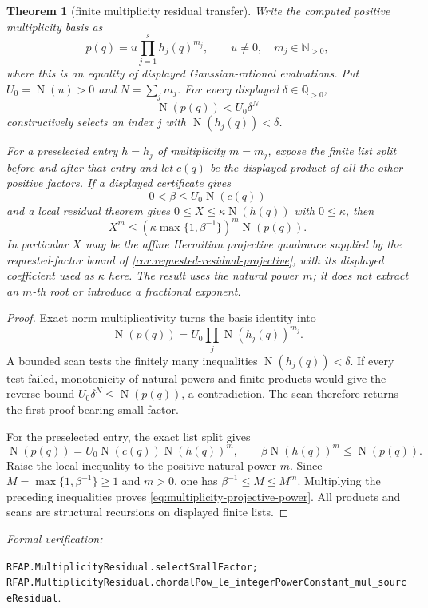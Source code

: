 \documentclass[11pt]{article}
\newtheorem{theorem}{Theorem}[section]
\newcommand{\Q}{\mathbb{Q}}
\newcommand{\N}{\mathbb{N}}
\newcommand{\Norm}[1]{\operatorname{N}\!\left(#1\right)}
\newcommand{\leanref}[1]{\par\smallskip\noindent
  \emph{Formal verification:}\par\nobreak
  {\raggedright\nolinkurl{#1}.\par}}
\begin{document}
\begin{theorem}[finite multiplicity residual transfer]
\label{thm:multiplicity-residual}
Write the computed positive multiplicity basis as
\[
             p(q)=u\prod_{j=1}^{s}h_j(q)^{m_j},
 \qquad u\ne0,\quad m_j\in\N_{>0},
\]
where this is an equality of displayed Gaussian-rational evaluations.  Put
$U_0=\Norm u>0$ and $N=\sum_jm_j$.  For every displayed
$\delta\in\Q_{>0}$,
\[
             \Norm{p(q)}<U_0\delta^N
\]
constructively selects an index $j$ with
$\Norm{h_j(q)}<\delta$.

For a preselected entry $h=h_j$ of multiplicity $m=m_j$, expose the finite
list split before and after that entry and let $c(q)$ be the displayed product
of all the other positive factors.  If a displayed certificate gives
\[
       0<\beta\le U_0\Norm{c(q)}
\]
and a local residual theorem gives
$0\le X\le\kappa\Norm{h(q)}$ with $0\le\kappa$, then
\begin{equation}
\label{eq:multiplicity-projective-power}
 X^m\le
 \left(\kappa\max\{1,\beta^{-1}\}\right)^m\Norm{p(q)}.
\end{equation}
In particular $X$ may be the affine Hermitian projective quadrance supplied
by the requested-factor bound of
\cref{cor:requested-residual-projective}, with its
displayed coefficient used as $\kappa$ here.  The result uses the natural power $m$;
it does not extract an $m$-th root or introduce a fractional exponent.
\end{theorem}

\begin{proof}
Exact norm multiplicativity turns the basis identity into
\[
 \Norm{p(q)}=U_0\prod_j\Norm{h_j(q)}^{m_j}.
\]
A bounded scan tests the finitely many inequalities
$\Norm{h_j(q)}<\delta$.  If every test failed, monotonicity of natural powers
and finite products would give the reverse bound
$U_0\delta^N\le\Norm{p(q)}$, a contradiction.  The scan therefore returns
the first proof-bearing small factor.

For the preselected entry, the exact list split gives
\[
 \Norm{p(q)}=U_0\Norm{c(q)}\Norm{h(q)}^m,
 \qquad
 \beta\Norm{h(q)}^m\le\Norm{p(q)}.
\]
Raise the local inequality to the positive natural power $m$.  Since
$M=\max\{1,\beta^{-1}\}\ge1$ and $m>0$, one has
$\beta^{-1}\le M\le M^m$.  Multiplying the preceding inequalities proves
\eqref{eq:multiplicity-projective-power}.  All products and scans are structural
recursions on displayed finite lists.
\end{proof}

\leanref{RFAP.MultiplicityResidual.selectSmallFactor;
RFAP.MultiplicityResidual.chordalPow_le_integerPowerConstant_mul_sourceResidual}
\end{document}
